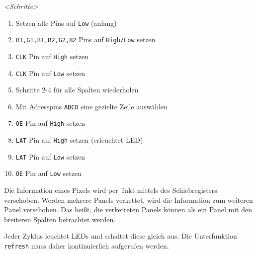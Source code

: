\emph{<Schritte>}
\begin{enumerate}
	\item Setzen alle Pins auf \texttt{Low} (anfang)
	\item \texttt{R1,G1,B1,R2,G2,B2} Pins auf \texttt{High/Low} setzen
	\item \texttt{CLK} Pin auf \texttt{High} setzen
	\item \texttt{CLK} Pin auf \texttt{Low} setzen
	\item Schritte 2-4 für alle Spalten wiederholen
	\item Mit Adresspins \texttt{ABCD} eine gezielte Zeile auswählen
	\item \texttt{OE} Pin auf \texttt{High} setzen
	\item \texttt{LAT} Pin auf \texttt{High} setzen (erleuchtet LED)
	\item \texttt{LAT} Pin auf \texttt{Low} setzen
	\item \texttt{OE} Pin auf \texttt{Low} setzen
\end{enumerate}

Die Information eines Pixels wird per Takt mittels des Schiebregisters verschoben. Werden mehrere Panels verkettet, wird die Information zum weiteren Panel verschoben. Das heißt, die verketteten Panels können als ein Panel mit den breiteren Spalten betrachtet werden.

Jeder Zyklus leuchtet LEDs und schaltet diese gleich aus. Die Unterfunktion \texttt{refresh} muss daher kontinuierlich aufgerufen werden.